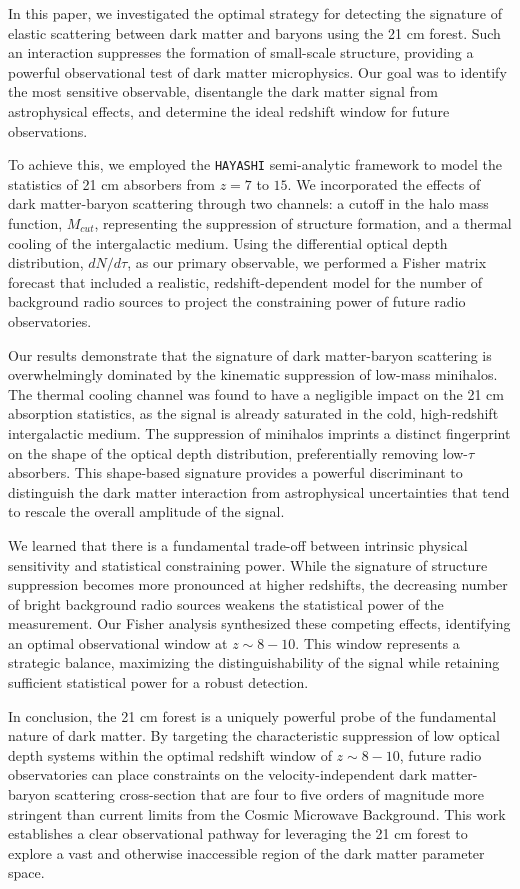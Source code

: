 \documentclass[]{article}
\begin{document}
In this paper, we investigated the optimal strategy for detecting the signature of elastic scattering between dark matter and baryons using the 21 cm forest. Such an interaction suppresses the formation of small-scale structure, providing a powerful observational test of dark matter microphysics. Our goal was to identify the most sensitive observable, disentangle the dark matter signal from astrophysical effects, and determine the ideal redshift window for future observations.

To achieve this, we employed the \texttt{HAYASHI} semi-analytic framework to model the statistics of 21 cm absorbers from $z=7$ to $15$. We incorporated the effects of dark matter-baryon scattering through two channels: a cutoff in the halo mass function, $M_{cut}$, representing the suppression of structure formation, and a thermal cooling of the intergalactic medium. Using the differential optical depth distribution, $dN/d\tau$, as our primary observable, we performed a Fisher matrix forecast that included a realistic, redshift-dependent model for the number of background radio sources to project the constraining power of future radio observatories.

Our results demonstrate that the signature of dark matter-baryon scattering is overwhelmingly dominated by the kinematic suppression of low-mass minihalos. The thermal cooling channel was found to have a negligible impact on the 21 cm absorption statistics, as the signal is already saturated in the cold, high-redshift intergalactic medium. The suppression of minihalos imprints a distinct fingerprint on the shape of the optical depth distribution, preferentially removing low-$\tau$ absorbers. This shape-based signature provides a powerful discriminant to distinguish the dark matter interaction from astrophysical uncertainties that tend to rescale the overall amplitude of the signal.

We learned that there is a fundamental trade-off between intrinsic physical sensitivity and statistical constraining power. While the signature of structure suppression becomes more pronounced at higher redshifts, the decreasing number of bright background radio sources weakens the statistical power of the measurement. Our Fisher analysis synthesized these competing effects, identifying an optimal observational window at $z \sim 8-10$. This window represents a strategic balance, maximizing the distinguishability of the signal while retaining sufficient statistical power for a robust detection.

In conclusion, the 21 cm forest is a uniquely powerful probe of the fundamental nature of dark matter. By targeting the characteristic suppression of low optical depth systems within the optimal redshift window of $z \sim 8-10$, future radio observatories can place constraints on the velocity-independent dark matter-baryon scattering cross-section that are four to five orders of magnitude more stringent than current limits from the Cosmic Microwave Background. This work establishes a clear observational pathway for leveraging the 21 cm forest to explore a vast and otherwise inaccessible region of the dark matter parameter space.
\end{document}
